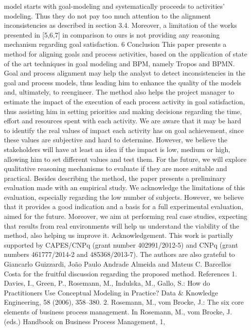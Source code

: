 model starts with goal-modeling and systematically proceeds to activities’ modeling.
Thus they do not pay too much attention to the alignment inconsistencies as described
in section 3.4. Moreover, a limitation of the works presented in [5,6,7] in comparison
to ours is not providing any reasoning mechanism regarding goal satisfaction.
6 Conclusion
This paper presents a method for aligning goals and process activities, based on the
application of state of the art techniques in goal modeling and BPM, namely Tropos
and BPMN.
Goal and process alignment may help the analyst to detect inconsistencies in the goal
and process models, thus leading him to enhance the quality of the models and, ultimately, to reengineer. The method also helps the project manager to estimate the impact
of the execution of each process activity in goal satisfaction, thus assisting him in setting priorities and making decisions regarding the time, effort and resources spent with
each activity.
We are aware that it may be hard to identify the real values of impact each activity
has on goal achievement, since these values are subjective and hard to determine. However, we believe the stakeholders will have at least an idea if the impact is low, medium
or high, allowing him to set different values and test them. For the future, we will explore qualitative reasoning mechanisms to evaluate if they are more suitable and practical.
Besides describing the method, the paper presents a preliminary evaluation made
with an empirical study. We acknowledge the limitations of this evaluation, especially
regarding the low number of subjects. However, we believe that it provides a good
indication and a basis for a full experimental evaluation, aimed for the future. Moreover, we aim at performing real case studies, expecting that results from real environments will help us understand the viability of the method, also helping us improve it.
Acknowledgement. This work is partially supported by CAPES/CNPq (grant number
402991/2012-5) and CNPq (grant numbers 461777/2014-2 and 485368/2013-7). The authors are 
also grateful to Giancarlo Guizzardi, João Paulo Andrade Almeida and Mateus C. Barcellos Costa
for the fruitful discussion regarding the proposed method.
References
1. Davies, I., Green, P., Rosemann, M., Indulska, M., Gallo, S.: How do Practitioners Use
Conceptual Modeling in Practice? Data & Knowledge Engineering, 58 (2006), 358--380.
2. Rosemann, M., vom Brocke, J.: The six core elements of business process management. In
Rosemann, M., vom Brocke, J. (eds.) Handbook on Business Process Management, 1,
